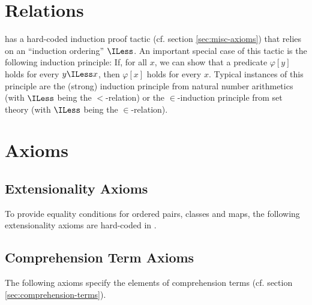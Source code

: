 \documentclass{stex}
\begin{document}
\section{Relations}\label{sec:relations}


\Naproche has a hard-coded induction proof tactic (cf. section
\ref{sec:misc-axioms}) that relies on an ``induction ordering'' $\ILess$.
An important special case of this tactic is the following induction principle:
If, for all $x$, we can show that a predicate $\varphi[y]$ holds for every
$y \ILess x$, then $\varphi[x]$ holds for every $x$.
Typical instances of this principle are the (strong) induction principle from
natural number arithmetics (with $\ILess$ being the $<$-relation) or the
$\in$-induction principle from set theory (with $\ILess$ being the
$\in$-relation).



\section{Axioms}\label{sec:axioms}

\subsection{Extensionality Axioms}\label{sec:extensionality-axioms}

To provide equality conditions for ordered pairs, classes and maps, the
following extensionality axioms are hard-coded in \Naproche.



\subsection{Comprehension Term Axioms}\label{sec:comprehension-term-axioms}

The following axioms specify the elements of comprehension terms (cf. section
\ref{sec:comprehension-terms}).

\end{document}
